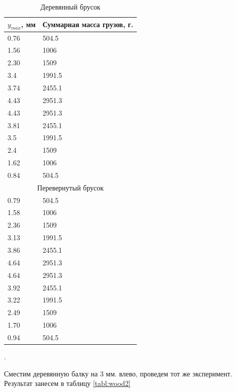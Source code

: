 \documentclass[a4paper, 12pt]{article}
\newcounter{Points}
\newcommand{\point}{\arabic{Points}. \addtocounter{Points}{1}}
\begin{document}
\begin{table}
    \centering
    \begin{tabular}{|l | l|}
        \hline 
        $y_{max}$, мм & Суммарная масса грузов, г. \\ \hline 
        0.76 & 504.5  \\ \hline
        1.56 & 1006   \\ \hline
        2.30 & 1509   \\ \hline
        3.4  & 1991.5 \\ \hline
        3.74 & 2455.1 \\ \hline
        4.43 & 2951.3 \\ \hline
        4.43 & 2951.3 \\ \hline
        3.81 & 2455.1 \\ \hline
        3.5  & 1991.5 \\ \hline
        2.4  & 1509   \\ \hline
        1.62 & 1006   \\ \hline
        0.84 & 504.5  \\ \hline

        \multicolumn{2}{|c|}{Перевернутый брусок} \\ \hline

        0.79 & 504.5  \\ \hline
        1.58 & 1006   \\ \hline
        2.36 & 1509   \\ \hline
        3.13 & 1991.5 \\ \hline
        3.86 & 2455.1 \\ \hline
        4.64 & 2951.3 \\ \hline
        4.64 & 2951.3 \\ \hline
        3.92 & 2455.1 \\ \hline
        3.22 & 1991.5 \\ \hline
        2.49 & 1509   \\ \hline
        1.70 & 1006   \\ \hline
        0.94 & 504.5  \\ \hline
    \end{tabular}
    \caption{Деревянный брусок}
    \label{tabl:wood1}
\end{table}

\point Сместим деревянную балку на 3 мм. влево, проведем тот же эксперимент. Результат занесем в таблицу \ref{tabl:wood2}
\end{document}
